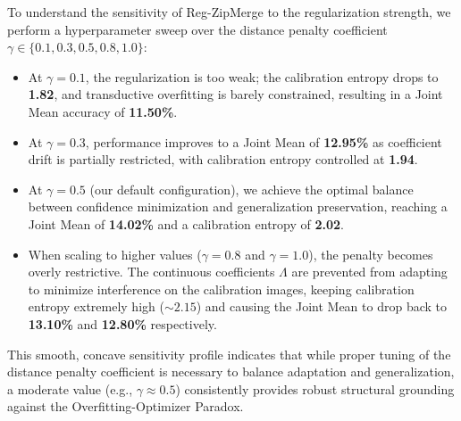 To understand the sensitivity of Reg-ZipMerge to the regularization strength, we perform a hyperparameter sweep over the distance penalty coefficient $\gamma \in \{0.1, 0.3, 0.5, 0.8, 1.0\}$:
\begin{itemize}[leftmargin=*]
    \item At $\gamma = 0.1$, the regularization is too weak; the calibration entropy drops to \textbf{1.82}, and transductive overfitting is barely constrained, resulting in a Joint Mean accuracy of \textbf{11.50\%}.
    \item At $\gamma = 0.3$, performance improves to a Joint Mean of \textbf{12.95\%} as coefficient drift is partially restricted, with calibration entropy controlled at \textbf{1.94}.
    \item At $\gamma = 0.5$ (our default configuration), we achieve the optimal balance between confidence minimization and generalization preservation, reaching a Joint Mean of \textbf{14.02\%} and a calibration entropy of \textbf{2.02}.
    \item When scaling to higher values ($\gamma = 0.8$ and $\gamma = 1.0$), the penalty becomes overly restrictive. The continuous coefficients $\Lambda$ are prevented from adapting to minimize interference on the calibration images, keeping calibration entropy extremely high ($\sim 2.15$) and causing the Joint Mean to drop back to \textbf{13.10\%} and \textbf{12.80\%} respectively.
\end{itemize}
This smooth, concave sensitivity profile indicates that while proper tuning of the distance penalty coefficient is necessary to balance adaptation and generalization, a moderate value (e.g., $\gamma \approx 0.5$) consistently provides robust structural grounding against the Overfitting-Optimizer Paradox.

